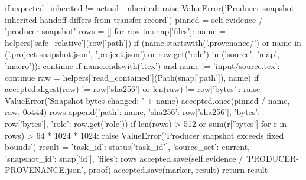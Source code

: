             if expected_inherited != actual_inherited:
                raise ValueError('Producer snapshot inherited handoff differs from transfer record')
        pinned = self.evidence / 'producer-snapshot'
        rows = []
        for row in snap['files']:
            name = helpers['safe_relative'](row['path'])
            if (name.startswith('.provenance/') or name in ('.project-snapshot.json', 'project.json')
                or row.get('role') in ('source', 'map', 'macro')):
                continue
            if name.endswith('.tex') and name != 'input/source.tex':
                continue
            raw = helpers['read_contained'](Path(snap['path']), name)
            if accepted.digest(raw) != row['sha256'] or len(raw) != row['bytes']:
                raise ValueError('Snapshot bytes changed: ' + name)
            accepted.once(pinned / name, raw, 0o444)
            rows.append({'path': name, 'sha256': row['sha256'], 'bytes': row['bytes'], 'role': row.get('role')})
        if len(rows) > 512 or sum(r['bytes'] for r in rows) > 64 * 1024 * 1024:
            raise ValueError('Producer snapshot exceeds fixed bounds')
        result = {'task_id': status['task_id'], 'source_set': current, 'snapshot_id': snap['id'], 'files': rows}
        accepted.save(self.evidence / 'PRODUCER-PROVENANCE.json', proof)
        accepted.save(marker, result)
        return result


